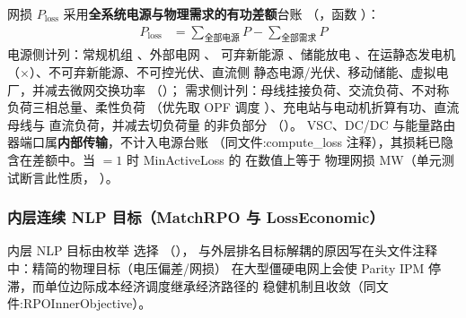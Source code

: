 网损 $P_{\mathrm{loss}}$ 采用\textbf{全系统电源与物理需求的有功差额}台账
（，函数
）：
\begin{align*}
P_{\mathrm{loss}} &= \sum_{\text{全部电源}} P - \sum_{\text{全部需求}} P
\end{align*}
电源侧计列：常规机组 、外部电网 、
可弃新能源 、储能放电 、在运静态发电机
（$\times$）、不可弃新能源、不可控光伏、直流侧
静态电源/光伏、移动储能、虚拟电厂，并减去微网交换功率
（）；
需求侧计列：母线挂接负荷、交流负荷、不对称负荷三相总量、柔性负荷
（优先取 OPF 调度 ）、充电站与电动机折算有功、直流母线与
直流负荷，并减去切负荷量  的非负部分
（）。
VSC、DC/DC 与能量路由器端口属\textbf{内部传输}，不计入电源台账
（同文件:compute\_loss 注释），其损耗已隐含在差额中。当
$=1$ 时 MinActiveLoss 的  在数值上等于
物理网损 MW（单元测试断言此性质，
）。

\subsubsection*{内层连续 NLP 目标（MatchRPO 与 LossEconomic）}
内层 NLP 目标由枚举  选择
（），
与外层排名目标解耦的原因写在头文件注释中：精简的物理目标（电压偏差/网损）
在大型僵硬电网上会使 Parity IPM 停滞，而单位边际成本经济调度继承经济路径的
稳健机制且收敛（同文件:RPOInnerObjective）。

